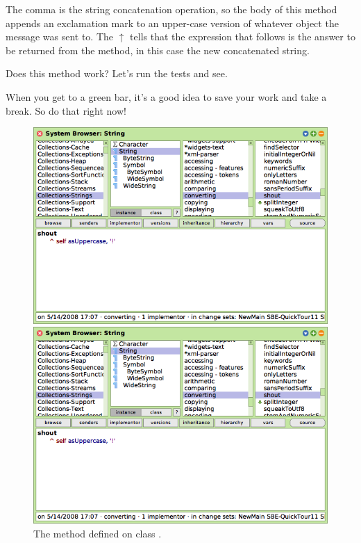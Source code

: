 \documentclass[a4paper,10pt,twoside]{book}
\begin{document}
The comma is the string concatenation operation, so the body of this method appends an exclamation mark to an upper-case version of whatever  object the  message was sent to.
The $\uparrow$ tells \sq that the expression that follows is the answer to be returned from the method, in this case the new concatenated string.

Does this method work?  Let's run the tests and see.

When you get to a green bar\footnotemark, it's a good idea to save your work and take a break.  
So do that right now!

\begin{figure}[hbt]
\ifluluelse
	{\centerline{\includegraphics[width=\textwidth]{String-Shout}}}
	{\centerline{\includegraphics[scale=0.7]{String-Shout}}}
\caption{The  method defined on class .
\label{fig:String-shout}}
\end{figure}
\end{document}
